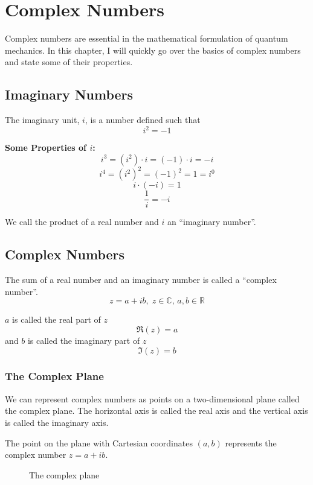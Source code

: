 \chapter{Complex Numbers}

Complex numbers are essential in the mathematical formulation of quantum mechanics. In this chapter,
I will quickly go over the basics of complex numbers and state some of their properties.

\section{Imaginary Numbers}
The imaginary unit, \(i\), is a number defined such that
\[ i^2 = -1 \]

\textbf{Some Properties of \(i\):}
\[i^3 = (i^2)\cdot i = (-1)\cdot i = -i\]
\[i^4 = {(i^2)}^2 = (-1)^2 = 1 = i^0\]
\[i\cdot(-i) = 1 \]
\[\frac{1}{i} = -i\]

We call the product of a real number and $i$ an ``imaginary number''.

\section{Complex Numbers}
The sum of a real number and an imaginary number is called a ``complex number''.
\[ z = a + ib,\; z\in\mathbb{C},\, a,b \in \mathbb{R}\]

\(a\) is called the real part of \(z\)
\[\Re(z) = a\] 
and \(b\) is called the imaginary part of \(z\)
\[\Im(z) = b\]

\subsection{The Complex Plane}
We can represent complex numbers as points on a two-dimensional plane called the complex plane. The 
horizontal axis is called the real axis and the vertical axis is called the imaginary axis.

The point on the plane with Cartesian coordinates \((a,b)\) represents the complex number \(z=a+ib\).

\begin{figure}[h]
    \centering 
    \caption{The complex plane}
\end{figure}

